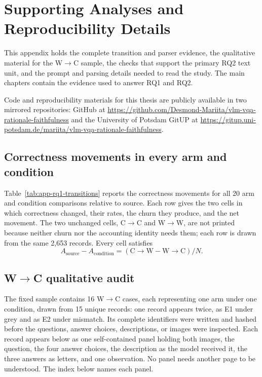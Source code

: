 
\chapter{Supporting Analyses and Reproducibility Details}
\label{app:supplementary}

This appendix holds the complete transition and parser evidence, the qualitative
material for the W$\rightarrow$C sample, the checks that support the primary RQ2
text unit, and the prompt and parsing details needed to read the study. The main
chapters contain the evidence used to answer RQ1 and RQ2.

Code and reproducibility materials for this thesis are publicly available in two
mirrored repositories: GitHub at
\url{https://github.com/Desmond-Mariita/vlm-vqa-rationale-faithfulness}
and the University of Potsdam GitUP at
\url{https://gitup.uni-potsdam.de/mariita/vlm-vqa-rationale-faithfulness}.

\section{Correctness movements in every arm and \mbox{condition}}
\label{sec:app-rq1-transitions}

Table~\ref{tab:app-rq1-transitions} reports the correctness movements for all 20
arm and condition comparisons relative to source. Each row gives the two cells in
which correctness changed, their rates, the churn they produce, and the net
movement. The two unchanged cells, C$\rightarrow$C and W$\rightarrow$W, are not
printed because neither churn nor the accounting identity needs them; each row is
drawn from the same 2,653 records. Every cell satisfies
\[
  A_{\mathrm{source}}-A_{\mathrm{condition}}
  =(\mathrm{C\rightarrow W}-\mathrm{W\rightarrow C})/N.
\]



\section[Wrong-to-correct qualitative audit]{W$\rightarrow$C qualitative audit}
\label{sec:app-w2c}

The fixed sample contains 16 W$\rightarrow$C cases, each representing one arm under
one condition, drawn from 15 unique records: one record appears twice, as E1 under grey and as E2 under
mismatch. Its complete identifiers were written and hashed before the questions,
answer choices, descriptions, or images were inspected. Each record appears below as one self-contained panel
holding both images, the question, the four answer choices, the description as
the model received it, the three answers as letters, and one observation. No
panel needs another page to be understood. The index below names each panel.

